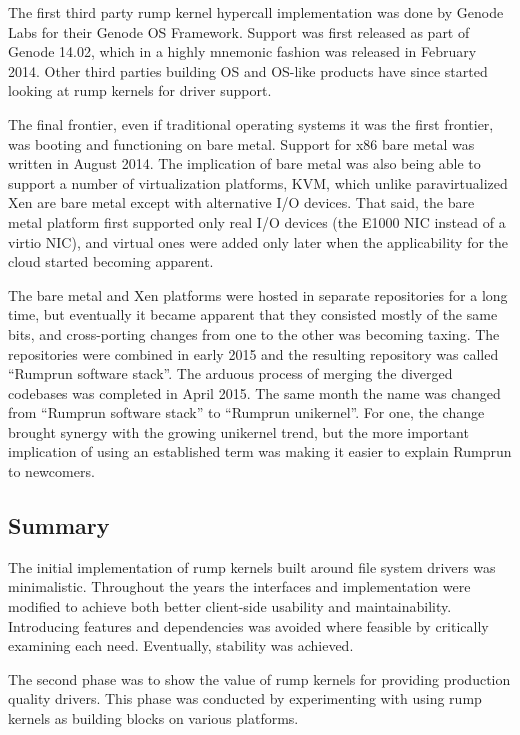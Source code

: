 The first third party rump kernel hypercall implementation was done by
Genode Labs for their Genode OS Framework.  Support was first released
as part of Genode 14.02, which in a highly mnemonic fashion was released
in February 2014.  Other third parties building OS and OS-like products
have since started looking at rump kernels for driver support.

The final frontier, even if traditional operating systems it was the
first frontier, was booting and functioning on bare metal.  Support for
x86 bare metal was written in August 2014.  The implication of bare metal
was also being able to support a number of virtualization platforms, \eg
KVM, which unlike paravirtualized Xen are bare metal except with alternative
I/O devices.  That said, the bare metal platform first supported only
real I/O devices (\eg the E1000 NIC instead of a virtio NIC), and virtual
ones were added only later when the applicability for the cloud started
becoming apparent.

The bare metal and Xen platforms were hosted in separate repositories
for a long time, but eventually it became apparent that they consisted
mostly of the same bits, and cross-porting changes from one to the other
was becoming taxing.  The repositories were combined in early 2015 and
the resulting repository was called ``Rumprun software stack''.  The arduous
process of merging the diverged codebases was completed in April 2015.
The same month the name was changed from ``Rumprun software stack''
to ``Rumprun unikernel''.  For one, the change brought synergy with the
growing unikernel trend, but the more important implication of using an
established term was making it easier to explain Rumprun to newcomers.


\subsection{Summary}

The initial implementation of rump kernels built around file system
drivers was minimalistic.  Throughout the years the interfaces and
implementation were modified to achieve both better client-side usability
and maintainability.  Introducing features and dependencies was avoided
where feasible by critically examining each need.  Eventually, stability
was achieved.

The second phase was to show the value of rump kernels for providing
production quality drivers.  This phase was conducted by experimenting
with using rump kernels as building blocks on various platforms.
